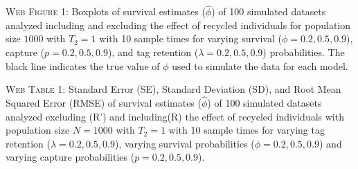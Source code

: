 \documentclass[]{article}
\begin{document}
\textsc{Web Figure 1:} Boxplots of survival estimates (\(\hat{\phi}\))
of 100 simulated datasets analyzed including and excluding the effect of
recycled individuals for population size \(1000\) with \(T_2=1\) with 10
sample times for varying survival (\(\phi=0.2,0.5,0.9\)), capture
(\(p=0.2,0.5,0.9\)), and tag retention (\(\lambda=0.2,0.5,0.9\))
probabilities. The black line indicates the true value of \(\phi\) used
to simulate the data for each model.

\textsc{Web Table 1:} Standard Error (SE), Standard Deviation (SD), and
Root Mean Squared Error (RMSE) of survival estimates (\(\hat{\phi}\)) of
100 simulated datasets analyzed excluding (R') and including(R) the effect of
recycled individuals with population size \(N=1000\) with \(T_2=1\) with
10 sample times for varying tag retention (\(\lambda=0.2,0.5,0.9\)),
varying survival probabilities (\(\phi=0.2,0.5,0.9\)) and varying
capture probabilities (\(p=0.2,0.5,0.9\)).
\end{document}
